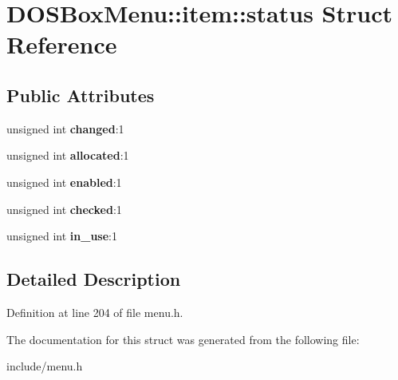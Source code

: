 \hypertarget{structDOSBoxMenu_1_1item_1_1status}{\section{D\-O\-S\-Box\-Menu\-:\-:item\-:\-:status Struct Reference}
\label{structDOSBoxMenu_1_1item_1_1status}
}
\subsection*{Public Attributes}
\begin{DoxyCompactItemize}
\item 
\hypertarget{structDOSBoxMenu_1_1item_1_1status_aa4f8abd7e72a494212a6082f7f599c11}{unsigned int {\bfseries changed}\-:1}\label{structDOSBoxMenu_1_1item_1_1status_aa4f8abd7e72a494212a6082f7f599c11}

\item 
\hypertarget{structDOSBoxMenu_1_1item_1_1status_a187af4bc1b360547841fd771c4d415e1}{unsigned int {\bfseries allocated}\-:1}\label{structDOSBoxMenu_1_1item_1_1status_a187af4bc1b360547841fd771c4d415e1}

\item 
\hypertarget{structDOSBoxMenu_1_1item_1_1status_aec8684a6d58444febc1db66aa604c299}{unsigned int {\bfseries enabled}\-:1}\label{structDOSBoxMenu_1_1item_1_1status_aec8684a6d58444febc1db66aa604c299}

\item 
\hypertarget{structDOSBoxMenu_1_1item_1_1status_a10170b369becf69be194bac19c92d58b}{unsigned int {\bfseries checked}\-:1}\label{structDOSBoxMenu_1_1item_1_1status_a10170b369becf69be194bac19c92d58b}

\item 
\hypertarget{structDOSBoxMenu_1_1item_1_1status_a2bc81ac9e76ce71e691d123618377194}{unsigned int {\bfseries in\-\_\-use}\-:1}\label{structDOSBoxMenu_1_1item_1_1status_a2bc81ac9e76ce71e691d123618377194}

\end{DoxyCompactItemize}


\subsection{Detailed Description}


Definition at line 204 of file menu.\-h.



The documentation for this struct was generated from the following file\-:\begin{DoxyCompactItemize}
\item 
include/menu.\-h\end{DoxyCompactItemize}
